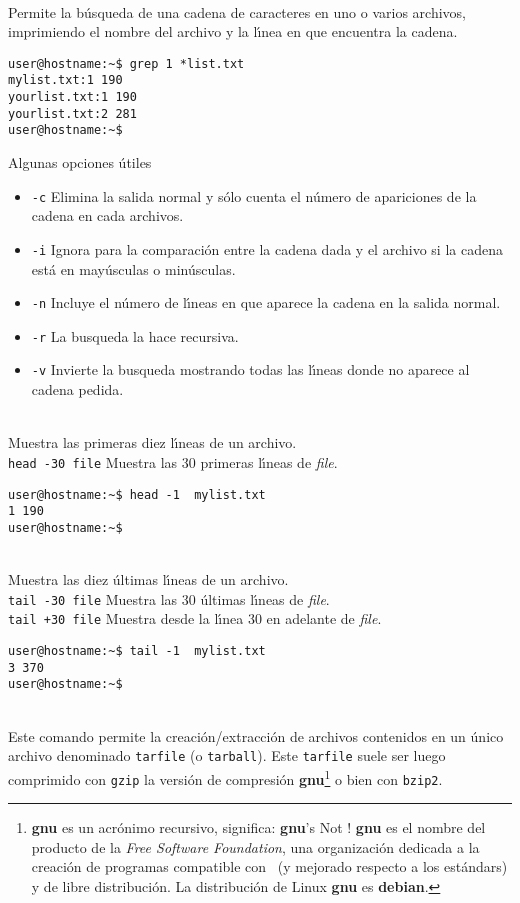 \noindent
{}\\
Permite la b{\'u}squeda de una cadena de caracteres en uno o varios
archivos, imprimiendo el nombre del archivo y la l{\'\i}nea en que
encuentra la cadena. 
\begin{verbatim}
user@hostname:~$ grep 1 *list.txt
mylist.txt:1 190
yourlist.txt:1 190
yourlist.txt:2 281
user@hostname:~$
\end{verbatim}
Algunas opciones {\'u}tiles
\begin{itemize}
\item {\verb+-c+} Elimina la salida normal y s{\'o}lo cuenta el n{\'u}mero de
  apariciones de la cadena en cada archivos.
\item {\verb+-i+} Ignora para la comparaci{\'o}n entre la cadena dada y el
  archivo si la cadena est{\'a} en may{\'u}sculas o min{\'u}sculas.
\item {\verb+-n+} Incluye el n{\'u}mero de l{\'\i}neas en que aparece la cadena
  en la salida normal.
\item {\verb+-r+} La busqueda la hace recursiva.
\item {\verb+-v+} Invierte la busqueda mostrando todas las l{\'\i}neas
  donde no aparece al cadena pedida.
\end{itemize}


\noindent
{}\\
 Muestra las primeras diez l{\'\i}neas de un archivo.\\
{\verb+head -30 file+} Muestra las 30 primeras l{\'\i}neas de {\it file}.
\begin{verbatim}
user@hostname:~$ head -1  mylist.txt
1 190
user@hostname:~$
\end{verbatim}

\noindent
{}\\
Muestra las diez {\'u}ltimas l{\'\i}neas de un archivo. \\
\verb=tail -30 file= Muestra las 30 {\'u}ltimas l{\'\i}neas de {\it file}.\\
\verb=tail +30 file= Muestra desde la l{\'\i}nea 30 en adelante de {\it file}.
\begin{verbatim}
user@hostname:~$ tail -1  mylist.txt
3 370
user@hostname:~$
\end{verbatim}

\noindent
{} \\
Este comando permite la creaci{\'o}n/extracci{\'o}n de archivos contenidos en
un {\'u}nico archivo denominado \verb+tarfile+ (o \verb+tarball+). Este
\verb+tarfile+ suele ser luego comprimido con \verb+gzip+ la versi{\'o}n
de compresi{\'o}n {\bf gnu}\footnote{{\bf gnu} es un acr{\'o}nimo recursivo,
  significa: {\bf gnu}'s Not \unix!  {\bf gnu} es el nombre del
  producto de la {\it Free Software Foundation}, una organizaci{\'o}n
  dedicada a la creaci{\'o}n de programas compatible con \unix\ (y
  mejorado respecto a los est{\'a}ndars) y de libre distribuci{\'o}n. La
  distribuci{\'o}n de Linux {\bf gnu} es {\bf debian}.} o bien con
\verb+bzip2+.

